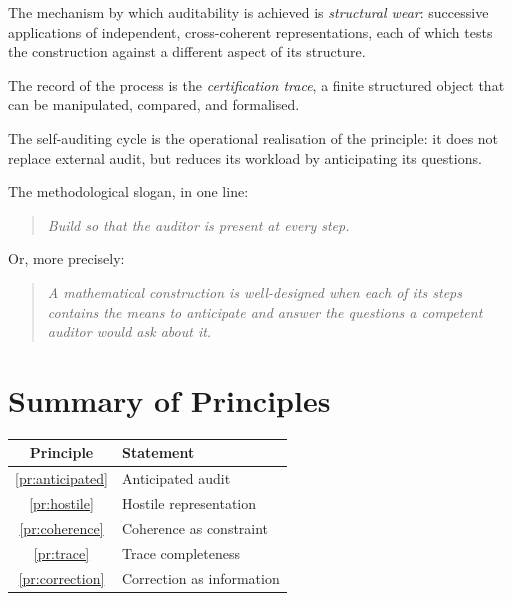 \documentclass[11pt,a4paper]{article}
\theoremstyle{definition}
\theoremstyle{plain}
\begin{document}
The mechanism by which auditability is achieved is \emph{structural
wear}: successive applications of independent, cross-coherent
representations, each of which tests the construction against a
different aspect of its structure.

The record of the process is the \emph{certification trace}, a
finite structured object that can be manipulated, compared, and
formalised.

The self-auditing cycle is the operational realisation of the
principle: it does not replace external audit, but reduces its
workload by anticipating its questions.

\medskip

The methodological slogan, in one line:

\begin{quote}
\emph{Build so that the auditor is present at every step.}
\end{quote}

Or, more precisely:

\begin{quote}
\emph{A mathematical construction is well-designed when each of its
steps contains the means to anticipate and answer the questions a
competent auditor would ask about it.}
\end{quote}

\appendix

\section{Summary of Principles}
\label{app:principles}

\begin{center}
\begin{tabular}{c l}
  \toprule
  Principle & Statement \\
  \midrule
  \ref{pr:anticipated} & Anticipated audit \\
  \ref{pr:hostile} & Hostile representation \\
  \ref{pr:coherence} & Coherence as constraint \\
  \ref{pr:trace} & Trace completeness \\
  \ref{pr:correction} & Correction as information \\
  \bottomrule
\end{tabular}
\end{center}
\end{document}
